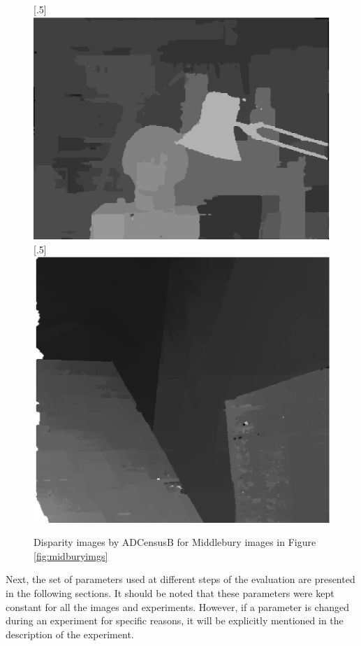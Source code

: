 \begin{figure}[H]
\centering
{}
[.5\linewidth]{\includegraphics[scale=0.5]{tsukubadisp}}%
[.5\linewidth]{\includegraphics[scale=0.51]{venusdisp}}%
\caption{Disparity images by ADCensusB for Middlebury images in Figure \protect\ref{fig:midburyimgs}}
\label{fig:midburydisps}
\end{figure}

Next, the set of parameters used at different steps of the evaluation are presented in the following sections.
It should be noted that these parameters were kept constant for all the images and experiments. However, if a parameter is changed during an experiment for specific
reasons, it will be explicitly mentioned in the description of the experiment.

